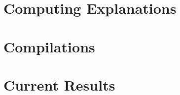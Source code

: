 %

\section[Computing]{Computing Explanations}
\subsection*{}

\begin{frame}{}

\end{frame}



%

\section[Compilations]{Compilations}
\subsection*{}

\begin{frame}{}

\end{frame}



%

\section[Results]{Current Results}
\subsection*{}


